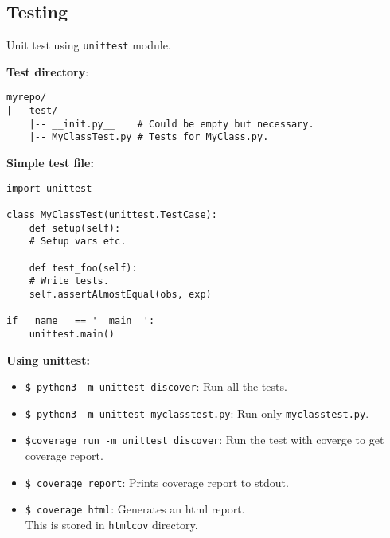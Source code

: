 \subsection{Testing}

Unit test using \texttt{unittest} module.

\textbf{Test directory}:\\
\begin{mdframed}[backgroundcolor=gray!10,linecolor=Firebrick4]
\begin{verbatim}
myrepo/
|-- test/
    |-- __init.py__    # Could be empty but necessary.
    |-- MyClassTest.py # Tests for MyClass.py.
\end{verbatim}
\end{mdframed}


\textbf{Simple test file:}\\

\begin{mdframed}[backgroundcolor=gray!10,linecolor=Firebrick4]
\begin{verbatim}
import unittest

class MyClassTest(unittest.TestCase):
    def setup(self):
    # Setup vars etc.

    def test_foo(self):
    # Write tests.
    self.assertAlmostEqual(obs, exp)

if __name__ == '__main__':
    unittest.main()

\end{verbatim}
\end{mdframed}

\textbf{Using unittest:}
\begin{itemize}
    \item \texttt{\$ python3 -m unittest discover}: Run all the tests.
    \item \texttt{\$ python3 -m unittest myclasstest.py}: Run only \texttt{myclasstest.py}. 
    \item \texttt{\$coverage run -m unittest discover}: Run the test with coverge to get coverage report.
    \item \texttt{\$ coverage report}: Prints coverage report to stdout.
    \item \texttt{\$ coverage html}: Generates an html report.\\
            This is stored in \texttt{htmlcov} directory.\\
\end{itemize}



\pagebreak
